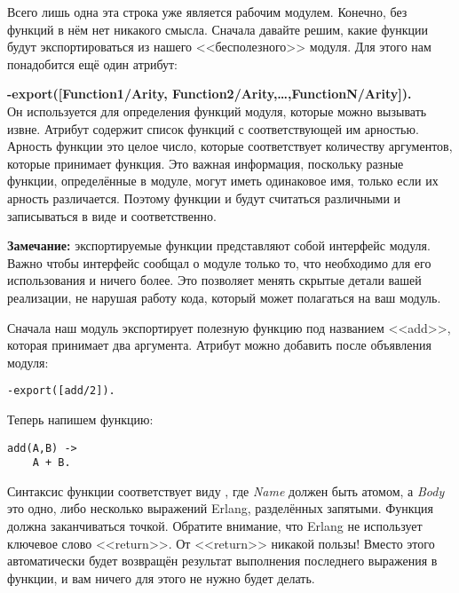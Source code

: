 Всего лишь одна эта строка уже является рабочим модулем.
Конечно, без функций в нём нет никакого смысла.
Сначала давайте решим, какие функции будут экспортироваться из нашего <<бесполезного>> модуля.
Для этого нам понадобится ещё один атрибут:

\begin{minipage}{1.0\linewidth}
    \textbf{-export([Function1/Arity, Function2/Arity,\ldots,FunctionN/Arity]).}\\ 
    Он используется для определения функций модуля, которые можно вызывать извне.
    Атрибут содержит список функций с соответствующей им арностью.
    Арность функции это целое число, которые соответствует количеству аргументов, которые принимает функция.
    Это важная информация, поскольку разные функции, определённые в модуле, могут иметь одинаковое имя, только если их арность различается.
    Поэтому функции  и  будут считаться различными и записываться в виде  и  соответственно.
\end{minipage}

\colorbox{lgray}{
    \begin{minipage}{1\linewidth}
        \textbf{Замечание:} экспортируемые функции представляют собой интерфейс модуля.
        Важно чтобы интерфейс сообщал о модуле только то, что необходимо для его использования и ничего более.
        Это позволяет менять скрытые детали вашей реализации, не нарушая работу кода, который может полагаться на ваш модуль.
    \end{minipage}
}

Сначала наш модуль экспортирует полезную функцию под названием <<add>>, которая принимает два аргумента.
Атрибут  можно добавить после объявления модуля:
\begin{lstlisting}[style=repl]
-export([add/2]).
\end{lstlisting}

Теперь напишем функцию:
\begin{lstlisting}[style=erlang]
add(A,B) ->
    A + B.
\end{lstlisting}

Синтаксис функции соответствует виду , где \emph{Name} должен быть атомом, а \emph{Body} это одно, либо несколько выражений Erlang, разделённых запятыми.
Функция должна заканчиваться точкой.
Обратите внимание, что Erlang не использует ключевое слово <<return>>.
От <<return>> никакой пользы!
Вместо этого автоматически будет возвращён результат выполнения последнего выражения в функции, и вам ничего для этого не нужно будет делать.

